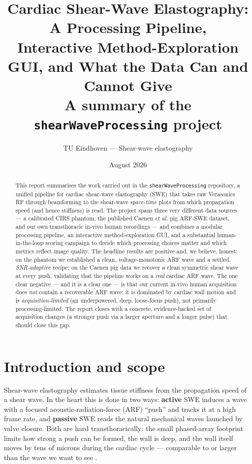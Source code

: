 \documentclass[11pt,a4paper]{article}
\title{\vspace{-1.5em}\textbf{Cardiac Shear-Wave Elastography: A Processing Pipeline,\\
Interactive Method-Exploration GUI, and What the Data Can and Cannot Give}\\[0.3em]
\large A summary of the \texttt{shearWaveProcessing} project}
\author{TU Eindhoven --- Shear-wave elastography}
\date{August 2026}
\begin{document}
\maketitle

\begin{abstract}
\noindent
This report summarises the work carried out in the \texttt{shearWaveProcessing} repository, a unified
pipeline for cardiac shear-wave elastography (SWE) that takes raw Verasonics RF through beamforming to
the shear-wave \emph{space-time} plots from which propagation speed (and hence stiffness) is read. The
project spans three very different data sources --- a calibrated CIRS phantom, the published Caenen
\emph{et al.} pig ARF-SWE dataset, and our own transthoracic in-vivo human recordings --- and combines a
modular processing pipeline, an interactive method-exploration GUI, and a substantial human-in-the-loop
scoring campaign to decide which processing choices matter and which metrics reflect image quality.
The headline results are positive and, we believe, honest: on the phantom we established a clean,
voltage-monotonic ARF wave and a settled, \emph{SNR-adaptive} recipe; on the Caenen pig data we recover
a clean symmetric shear wave at every push, validating that the pipeline works on a \emph{real} cardiac
ARF wave. The one clear negative --- and it is a clear one --- is that our current in-vivo human
acquisition does \emph{not} contain a recoverable ARF wave: it is dominated by cardiac wall motion and is
\emph{acquisition-limited} (an underpowered, deep, loose-focus push), not primarily processing-limited.
The report closes with a concrete, evidence-backed set of acquisition changes (a stronger push via a
larger aperture and a longer pulse) that should close this gap.
\end{abstract}

\section{Introduction and scope}
Shear-wave elastography estimates tissue stiffness from the propagation speed of a shear wave. In the
heart this is done in two ways: \textbf{active} SWE induces a wave with a focused acoustic-radiation-force
(ARF) ``push'' and tracks it at a high frame rate, and \textbf{passive} SWE reads the natural mechanical
waves launched by valve closure. Both are hard transthoracically: the small phased-array footprint limits
how strong a push can be formed, the wall is deep, and the wall itself moves by tens of microns during the
cardiac cycle --- comparable to or larger than the wave we want to see \cite{strachinaru2020,vos2024}.
\end{document}
